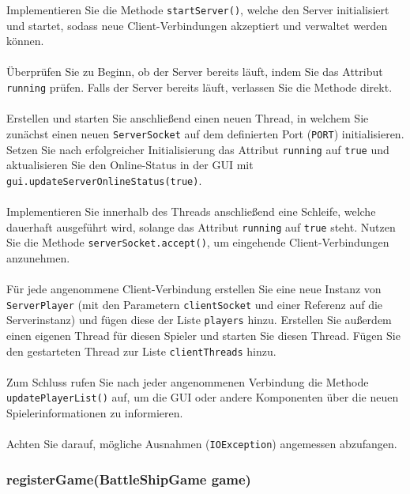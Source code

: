 \documentclass[12pt]{article}
\begin{document}
Implementieren Sie die Methode \texttt{startServer()}, welche den Server initialisiert und startet, 
sodass neue Client-Verbindungen akzeptiert und verwaltet werden können.
\\ \\
Überprüfen Sie zu Beginn, ob der Server bereits läuft, indem Sie das Attribut \texttt{running} prüfen. 
Falls der Server bereits läuft, verlassen Sie die Methode direkt.
\\ \\
Erstellen und starten Sie anschließend einen neuen Thread, 
in welchem Sie zunächst einen neuen \texttt{ServerSocket} auf dem definierten Port (\texttt{PORT}) initialisieren. 
Setzen Sie nach erfolgreicher Initialisierung das Attribut \texttt{running} auf \texttt{true} 
und aktualisieren Sie den Online-Status in der GUI mit \texttt{gui.updateServerOnlineStatus(true)}.
\\ \\
Implementieren Sie innerhalb des Threads anschließend eine Schleife, 
welche dauerhaft ausgeführt wird, solange das Attribut \texttt{running} auf \texttt{true} steht. 
Nutzen Sie die Methode \texttt{serverSocket.accept()}, um eingehende Client-Verbindungen anzunehmen.
\\ \\
Für jede angenommene Client-Verbindung erstellen Sie eine neue Instanz von \texttt{ServerPlayer} 
(mit den Parametern \texttt{clientSocket} und einer Referenz auf die Serverinstanz) 
und fügen diese der Liste \texttt{players} hinzu. 
Erstellen Sie außerdem einen eigenen Thread für diesen Spieler und starten Sie diesen Thread. 
Fügen Sie den gestarteten Thread zur Liste \texttt{clientThreads} hinzu.
\\ \\
Zum Schluss rufen Sie nach jeder angenommenen Verbindung die Methode \texttt{updatePlayer\hspace{0pt}List()} auf, 
um die GUI oder andere Komponenten über die neuen Spielerinformationen zu informieren. 
\\ \\
Achten Sie darauf, mögliche Ausnahmen (\texttt{IOException}) angemessen abzufangen.

\subsubsection*{registerGame(BattleShipGame game)}
\end{document}
